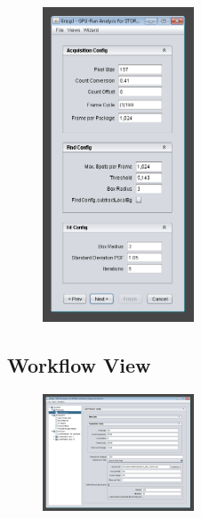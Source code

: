 \documentclass[aspectratio=169]{beamer}
\begin{document}
\begin{frame}
 
 \begin{figure}[h!]
    \centering	\includegraphics[width=0.4\textwidth]{./images/graspj_workflow4.png} 
    \caption{}
    \label{fig:workflow4}
    \end{figure} 
 
\end{frame}


\subsection{Workflow View}

\begin{frame}
 
 \begin{figure}[h!]
    \centering	\includegraphics[width=0.4\textwidth]{./images/graspj_workflow5.png} 
    \caption{}
    \label{fig:workflow5}
    \end{figure} 
 
\end{frame}
\end{document}
